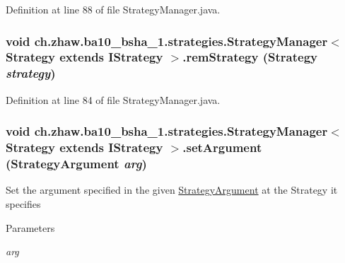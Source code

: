 Definition at line 88 of file StrategyManager.java.\hypertarget{classch_1_1zhaw_1_1ba10__bsha__1_1_1strategies_1_1StrategyManager_3_01Strategy_01extends_01IStrategy_01_4_a16db5f59ae5a1b7c74ac1badeafa71eb}{
\subsubsection[{remStrategy}]{\setlength{\rightskip}{0pt plus 5cm}void ch.zhaw.ba10\_\-bsha\_\-1.strategies.StrategyManager$<$ Strategy extends {\bf IStrategy} $>$.remStrategy (Strategy {\em strategy})}}
\label{classch_1_1zhaw_1_1ba10__bsha__1_1_1strategies_1_1StrategyManager_3_01Strategy_01extends_01IStrategy_01_4_a16db5f59ae5a1b7c74ac1badeafa71eb}


Definition at line 84 of file StrategyManager.java.\hypertarget{classch_1_1zhaw_1_1ba10__bsha__1_1_1strategies_1_1StrategyManager_3_01Strategy_01extends_01IStrategy_01_4_acc0184c50f60dfb73730396fd6eab5c6}{
\subsubsection[{setArgument}]{\setlength{\rightskip}{0pt plus 5cm}void ch.zhaw.ba10\_\-bsha\_\-1.strategies.StrategyManager$<$ Strategy extends {\bf IStrategy} $>$.setArgument ({\bf StrategyArgument} {\em arg})}}
\label{classch_1_1zhaw_1_1ba10__bsha__1_1_1strategies_1_1StrategyManager_3_01Strategy_01extends_01IStrategy_01_4_acc0184c50f60dfb73730396fd6eab5c6}
Set the argument specified in the given \hyperlink{classch_1_1zhaw_1_1ba10__bsha__1_1_1StrategyArgument}{StrategyArgument} at the Strategy it specifies


\begin{DoxyParams}{Parameters}
\item[{\em arg}]\end{DoxyParams}


